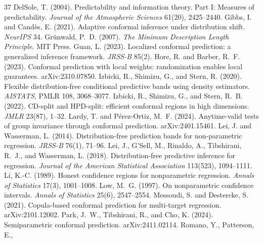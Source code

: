 \documentclass[11pt]{article}
\theoremstyle{remark}
\begin{document}
\begin{thebibliography}{37}
 DelSole, T. (2004). Predictability and
  information theory. Part I: Measures of predictability. \emph{Journal of the
  Atmospheric Sciences} 61(20), 2425--2440.
 Gibbs, I. and Cand\`es,
  E. (2021). Adaptive conformal inference under distribution shift.
  \emph{NeurIPS} 34.
 Gr\"unwald, P.~D. (2007). \emph{The
  Minimum Description Length Principle}. MIT Press.
 Guan, L. (2023). Localized conformal
  prediction: a generalized inference framework. \emph{JRSS-B} 85(2).
 Hore, R. and Barber, R.~F.
  (2023). Conformal prediction with local weights: randomization enables local
  guarantees. arXiv:2310.07850.
 Izbicki, R., Shimizu, G., and Stern,
  R. (2020). Flexible distribution-free conditional predictive bands using density
  estimators. \emph{AISTATS}, PMLR 108, 3068--3077.
 Izbicki, R., Shimizu, G., and Stern,
  R.~B. (2022). CD-split and HPD-split: efficient conformal regions in high
  dimensions. \emph{JMLR} 23(87), 1--32.
 Lardy, T. and
  P\'erez-Ortiz, M.~F. (2024). Anytime-valid tests of group invariance through
  conformal prediction. arXiv:2401.15461.
 Lei, J. and Wasserman,
  L. (2014). Distribution-free prediction bands for non-parametric regression.
  \emph{JRSS-B} 76(1), 71--96.
 Lei, J., G'Sell, M., Rinaldo, A.,
  Tibshirani, R.~J., and Wasserman, L. (2018). Distribution-free predictive inference
  for regression. \emph{Journal of the American Statistical Association} 113(523),
  1094--1111.
 Li, K.-C. (1989). Honest confidence regions
  for nonparametric regression. \emph{Annals of Statistics} 17(3), 1001--1008.
 Low, M.~G. (1997). On nonparametric
  confidence intervals. \emph{Annals of Statistics} 25(6), 2547--2554.
 Messoudi, S. and
  Destercke, S. (2021). Copula-based conformal prediction for multi-target
  regression. arXiv:2101.12002.
 Park, J.~W., Tibshirani, R.,
  and Cho, K. (2024). Semiparametric conformal prediction. arXiv:2411.02114.
 Romano, Y., Patterson, E.,

\end{thebibliography}
\end{document}
